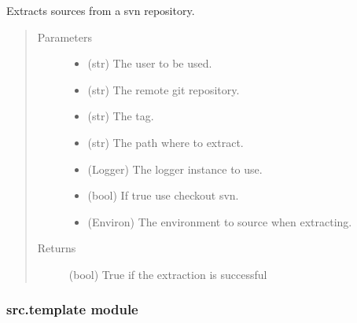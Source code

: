 \documentclass[a4paper,10pt,english]{sphinxmanual}
\begin{document}
\begin{fulllineitems}
\label{\detokenize{apidoc_src/src:src.system.svn_extract}}
Extracts sources from a svn repository.
\begin{quote}\begin{description}
\item[{Parameters}] \leavevmode\begin{itemize}
\item {} 
 \textendash{} (str) The user to be used.

\item {} 
 \textendash{} (str) The remote git repository.

\item {} 
 \textendash{} (str) The tag.

\item {} 
 \textendash{} (str) The path where to extract.

\item {} 
 \textendash{} (Logger) The logger instance to use.

\item {} 
 \textendash{} (bool) If true use checkout svn.

\item {} 
 \textendash{} (Environ)
The environment to source when extracting.

\end{itemize}

\item[{Returns}] \leavevmode
(bool) True if the extraction is successful

\end{description}\end{quote}

\end{fulllineitems}



\subsubsection{src.template module}
\label{\detokenize{apidoc_src/src:module-src.template}}\label{\detokenize{apidoc_src/src:src-template-module}}
\end{document}
